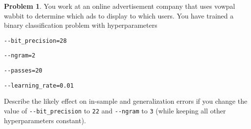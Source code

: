 \documentclass[10pt]{exam}
\theoremstyle{definition}
\newtheorem{problem}{Problem}
\begin{document}
\newpage
\begin{problem}
    You work at an online advertisement company that uses vowpal wabbit to determine which ads to display to which users.
    You have trained a binary classification problem with hyperparameters

        \vspace{0.1in}
        \lstinline{--bit_precision=28}

        \lstinline{--ngram=2}

        \lstinline{--passes=20}

        \lstinline{--learning_rate=0.01}
        \vspace{0.1in}

    \noindent
    Describe the likely effect on in-sample and generalization errors if you change the value of \lstinline{--bit_precision} to \lstinline{22} and \lstinline{--ngram} to \lstinline{3} (while keeping all other hyperparameters constant).
\end{problem}
\end{document}
